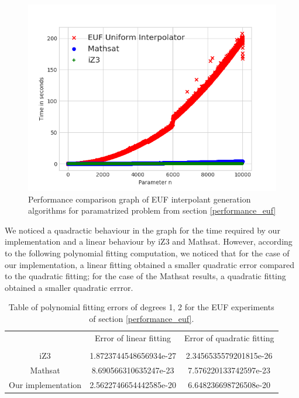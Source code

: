 \begin{figure}
  \centering
  \includegraphics[scale=0.9]{figures/eufi_performance_graph}
  \caption{Performance comparison graph of EUF interpolant generation
  algorithms for paramatrized problem from section \ref{performance_euf}} 
  \label{performance_graph_euf}
\end{figure}

We noticed a quadractic behaviour in the graph for the time 
required by our implementation
and a linear behaviour by iZ3 and Mathsat. However, 
according to the following polynomial 
fitting computation, 
we noticed that for the case of our implementation, 
a linear fitting obtained a smaller 
quadratic error compared to the quadratic fitting;  
for the case of the Mathsat
results, a quadratic fitting obtained a smaller 
quadratic errror.

\begin{table}[h]
  \centering
  \begin{tabular}{ccc}
    \toprule
    {}                 & Error of linear fitting & Error of quadratic fitting \\
    \cmidrule{2-2} \cmidrule{3-3} \\
    iZ3                &  1.8723744548656934e-27 & 2.3456535579201815e-26     \\
    Mathsat            &  8.690566310635247e-23  & 7.576220133742597e-23      \\
    Our implementation &  2.5622746654442585e-20 & 6.648236698726508e-20      \\
    \bottomrule
  \end{tabular}
  \caption{Table of polynomial fitting errors of degrees 1, 2 for the
  EUF experiments of section \ref{performance_euf}.}
\end{table}

